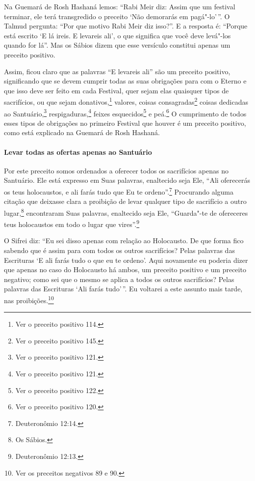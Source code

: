 \begin{multicols}{2}
Na Guemará\starr{} de Rosh Hashaná\starr{} lemos: ``Rabi Meir\starr{} diz: Assim que um festival
terminar, ele terá transgredido o preceito `Não demorarás em pagá"-lo'\,''.
O Talmud\starr{} pergunta: ``Por que motivo Rabi Meir\starr{} diz isso?''. E a resposta
é: ``Porque está escrito `E lá ireis. E levareis ali', o que significa
que você deve levá"-los quando for lá''. Mas os Sábios dizem que esse
versículo constitui apenas um preceito positivo.

Assim, ficou claro que as palavras ``E levareis ali'' são um preceito
positivo, significando que se devem cumprir todas as suas obrigações
para com o Eterno e que isso deve ser feito em cada Festival, quer sejam elas
quaisquer tipos de sacrifícios, ou que sejam donativos,\footnote{Ver o preceito positivo 114.} valores, coisas consagradas\footnote{Ver o preceito positivo 145.} coisas dedicadas ao
Santuário,\footnote{Ver o preceito positivo 121.} respigaduras,\footnote{Ver o preceito positivo 121.}
feixes esquecidos\footnote{Ver o preceito positivo 122.} e peá\starr.\footnote{Ver o preceito positivo 120.}
O cumprimento de todos esses tipos de obrigações no primeiro Festival
que houver é um preceito positivo, como está explicado na Guemará\starr{} de
Rosh Hashaná\starr.

\paragraph{Levar todas as ofertas apenas ao Santuário}

Por este preceito somos ordenados a oferecer todos os sacrifícios apenas
no Santuário. Ele está expresso em Suas palavras, enaltecido seja Ele,
``Ali oferecerás os teus holocaustos, e ali farás tudo que Eu te
ordeno''.\footnote{Deuteronômio 12:14.} Procurando alguma citação que deixasse
clara a proibição de levar qualquer tipo de sacrifício a outro
lugar,\footnote{Os Sábios.} encontraram Suas palavras, enaltecido seja
Ele, ``Guarda"-te de ofereceres teus holocaustos em todo o lugar que
vires''.\footnote{Deuteronômio 12:13.}

O Sifrei\starr{} diz: ``Eu sei disso apenas com relação ao Holocausto. De que
forma fico sabendo que é assim para com todos os outros sacrifícios?
Pelas palavras das Escrituras `E ali farás tudo o que eu te ordeno'.
Aqui novamente eu poderia dizer que apenas no caso do Holocausto há
ambos, um preceito positivo e um preceito negativo; como sei que o mesmo se aplica a todos os outros
sacrifícios? Pelas palavras das Escrituras `Ali farás tudo'\,''. Eu
voltarei a este assunto mais tarde, nas proibições.\footnote{Ver os preceitos negativos 89 e 90.}


\end{multicols}
